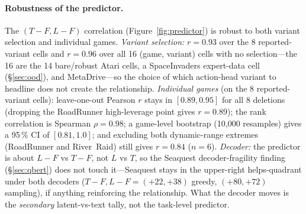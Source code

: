 \documentclass[11pt]{article}
\begin{document}
\paragraph{Robustness of the predictor.}
The $(T\!-\!F, L\!-\!F)$ correlation (Figure~\ref{fig:predictor}) is robust to both variant
selection and individual games. \emph{Variant selection:} $r=0.93$ over the 8 reported-variant cells
and $r=0.96$ over all 16 (game, variant) cells with no selection---the 16 are the 14 bare/robust
Atari cells, a SpaceInvaders expert-data cell (\S\ref{sec:ood}), and MetaDrive---so the choice of
which action-head variant to headline does not create the relationship. \emph{Individual games} (on the 8
reported-variant cells): leave-one-out Pearson $r$ stays in $[0.89, 0.95]$ for all 8 deletions
(dropping the RoadRunner high-leverage point gives $r=0.89$); the rank correlation is Spearman
$\rho=0.98$; a game-level bootstrap (10{,}000 resamples) gives a 95\,\% CI of $[0.81, 1.0]$; and
excluding both dynamic-range extremes (RoadRunner and River~Raid) still gives $r=0.84$ ($n=6$).
\emph{Decoder:} the predictor is about $L\!-\!F$ vs $T\!-\!F$, not $L$ vs $T$, so the
Seaquest decoder-fragility finding (\S\ref{sec:qbert}) does not touch it---Seaquest stays in the
upper-right helps-quadrant under both decoders ($T\!-\!F,L\!-\!F = (+22,+38)$ greedy,
$(+80,+72)$ sampling), if anything reinforcing the relationship. What the decoder moves is the
\emph{secondary} latent-vs-text tally, not the task-level predictor.
\end{document}
